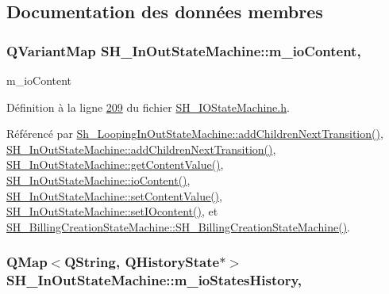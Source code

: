 \subsection{Documentation des données membres}
\hypertarget{classSH__InOutStateMachine_a661a1c7bd3b1086b3b5cd60ca957ecbd}{
\subsubsection[{m\-\_\-io\-Content}]{\setlength{\rightskip}{0pt plus 5cm}Q\-Variant\-Map S\-H\-\_\-\-In\-Out\-State\-Machine\-::m\-\_\-io\-Content\hspace{0.3cm}{\ttfamily [protected]}, {\ttfamily [inherited]}}}\label{classSH__InOutStateMachine_a661a1c7bd3b1086b3b5cd60ca957ecbd}


m\-\_\-io\-Content 



Définition à la ligne \hyperlink{SH__IOStateMachine_8h_source_l00209}{209} du fichier \hyperlink{SH__IOStateMachine_8h_source}{S\-H\-\_\-\-I\-O\-State\-Machine.\-h}.



Référencé par \hyperlink{classSh__LoopingInOutStateMachine_acfd8d0711c793b13c759f6c50be6a315}{Sh\-\_\-\-Looping\-In\-Out\-State\-Machine\-::add\-Children\-Next\-Transition()}, \hyperlink{classSH__InOutStateMachine_a689e5513ef6ef3fc1598efacd413372e}{S\-H\-\_\-\-In\-Out\-State\-Machine\-::add\-Children\-Next\-Transition()}, \hyperlink{classSH__InOutStateMachine_a2cdd914f1e597ac52d021106eec75c89}{S\-H\-\_\-\-In\-Out\-State\-Machine\-::get\-Content\-Value()}, \hyperlink{classSH__InOutStateMachine_a79b456cb2e353cb61ef9fe19c97fc8fb}{S\-H\-\_\-\-In\-Out\-State\-Machine\-::io\-Content()}, \hyperlink{classSH__InOutStateMachine_aa2766b7a7ba39c35a10df7fc0c151b4f}{S\-H\-\_\-\-In\-Out\-State\-Machine\-::set\-Content\-Value()}, \hyperlink{classSH__InOutStateMachine_a23a925522339132a51d16a7cff9074b9}{S\-H\-\_\-\-In\-Out\-State\-Machine\-::set\-I\-Ocontent()}, et \hyperlink{classSH__BillingCreationStateMachine_ad62b77fa4aeafe200056ff3974562f83}{S\-H\-\_\-\-Billing\-Creation\-State\-Machine\-::\-S\-H\-\_\-\-Billing\-Creation\-State\-Machine()}.

\hypertarget{classSH__InOutStateMachine_aaca2ea542b3f5b4cd238396b07492455}{
\subsubsection[{m\-\_\-io\-States\-History}]{\setlength{\rightskip}{0pt plus 5cm}Q\-Map$<$Q\-String, Q\-History\-State$\ast$$>$ S\-H\-\_\-\-In\-Out\-State\-Machine\-::m\-\_\-io\-States\-History\hspace{0.3cm}{\ttfamily [protected]}, {\ttfamily [inherited]}}}\label{classSH__InOutStateMachine_aaca2ea542b3f5b4cd238396b07492455}


